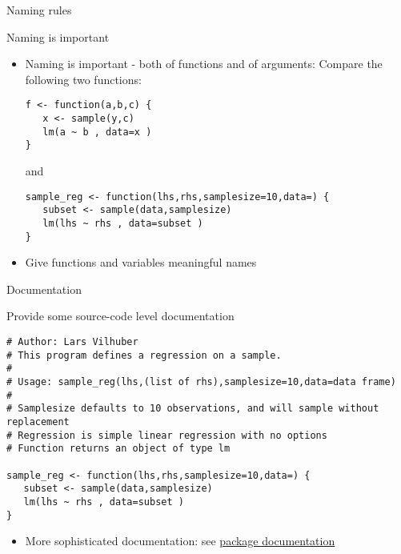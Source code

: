 \documentclass[xcolor=table,compress]{beamer}
\begin{document}
\begin{frame}[fragile]{Naming rules}
\begin{block}{Naming is important}
\begin{itemize}
\item Naming is important - both of functions and of arguments: Compare the following two functions:
\begin{lstlisting}
f <- function(a,b,c) {
   x <- sample(y,c)
   lm(a ~ b , data=x )
}
\end{lstlisting}
and
\begin{lstlisting}
sample_reg <- function(lhs,rhs,samplesize=10,data=) {
   subset <- sample(data,samplesize)
   lm(lhs ~ rhs , data=subset )
}
\end{lstlisting}
\item Give functions and variables meaningful names
\end{itemize}
\end{block}
\end{frame}


\begin{frame}[fragile]{Documentation}
\begin{block}{Provide some source-code level documentation}
\begin{lstlisting}
# Author: Lars Vilhuber 
# This program defines a regression on a sample.
#
# Usage: sample_reg(lhs,(list of rhs),samplesize=10,data=data frame)
#
# Samplesize defaults to 10 observations, and will sample without replacement
# Regression is simple linear regression with no options
# Function returns an object of type lm

sample_reg <- function(lhs,rhs,samplesize=10,data=) {
   subset <- sample(data,samplesize)
   lm(lhs ~ rhs , data=subset )
}

\end{lstlisting}
\begin{itemize}
\item More sophisticated documentation: see \href{http://r-pkgs.had.co.nz/man.html}{package 
documentation}
\end{itemize}
\end{block}

\end{frame}
\end{document}
